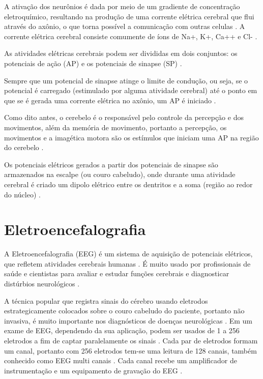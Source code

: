 A ativação dos neurônios é dada por meio de um gradiente de concentração eletroquímico, resultando na produção de uma corrente elétrica cerebral que flui através do axônio, o que torna possível a comunicação com outras celulas \cite{SIULYDissertacao}. A corrente elétrica cerebral consiste comumente de íons de Na+, K+, Ca++ e Cl- \cite{EEGSignals}.

As atividades elétricas cerebrais podem ser divididas em dois conjuntos: os potenciais de ação (AP) e os potenciais de sinapse (SP) \cite{SIULYDissertacao}.

Sempre que um potencial de sinapse atinge o limite de condução, ou seja, se o potencial é carregado (estimulado por alguma atividade cerebral) até o ponto em que se é gerada uma corrente elétrica no axônio, um AP é iniciado \cite{SIULYDissertacao}.

Como dito antes, o cerebelo é o responsável pelo controle da percepção e dos movimentos, além da memória de movimento, portanto a percepção, os movimentos e a imagética motora são os estímulos que iniciam uma AP na região do cerebelo \cite{alvarezneurobiomecanismos}.

Os potenciais elétricos gerados a partir dos potenciais de sinapse são armazenados na escalpe (ou couro cabeludo), onde durante uma atividade cerebral é criado um dipolo elétrico entre os dentritos e a soma (região ao redor do núcleo) \cite{SIULYDissertacao}.

\section{Eletroencefalografia}

A Eletroencefalografia (EEG) é um sistema de aquisição de potenciais elétricos, que refletem atividades cerebrais humanas \cite{Siulybook}. É muito usado por profissionais de saúde e cientistas para avaliar e estudar funções cerebrais e diagnosticar distúrbios neurológicos \cite{Siulybook}.

A técnica popular que registra sinais do cérebro usando eletrodos estrategicamente colocados sobre o couro cabeludo do paciente, portanto não invasiva, é muito importante nos diagnósticos de doenças neurológicas \cite{raobrain}. Em um exame de EEG, dependendo da sua aplicação, podem ser usados de 1 a 256 eletrodos a fim de captar paralelamente os sinais \cite{raobrain}. Cada par de eletrodos formam um canal, portanto com 256 eletrodos tem-se uma leitura de 128 canais, também conhecido como EEG multi canais \cite{raobrain}. Cada canal recebe um amplificador de instrumentação e um equipamento de gravação do EEG \cite{raobrain}.

